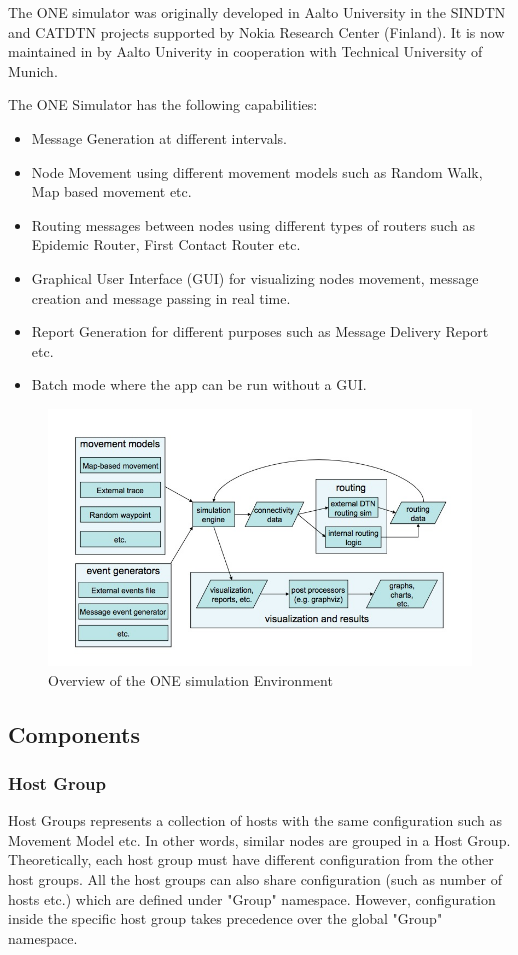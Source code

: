 The ONE simulator was originally developed in Aalto University in the SINDTN \cite{sindtn} and CATDTN projects supported by Nokia Research Center (Finland). It is now maintained in by Aalto Univerity in cooperation with Technical University of Munich.\newline

The ONE Simulator has the following capabilities:
\begin{itemize}
  \item Message Generation at different intervals.
  \item Node Movement using different movement models such as Random Walk, Map based movement etc.
  \item Routing messages between nodes using different types of routers such as Epidemic Router, First Contact Router etc.
  \item Graphical User Interface (GUI) for visualizing nodes movement, message creation and message passing in real time.
  \item Report Generation for different purposes such as Message Delivery Report etc.
  \item Batch mode where the app can be run without a GUI.
\end{itemize}

\begin{figure}[h]
\includegraphics[scale=0.5]{./figures/one}
\caption{Overview of the ONE simulation Environment \cite{keranen-theone}}
\end{figure}

\subsection{Components}
\subsubsection{Host Group}
Host Groups represents a collection of hosts with the same configuration such as Movement Model etc. In other words, similar nodes are grouped in a Host Group. Theoretically, each host group must have different configuration from the other host groups. All the host groups can also share configuration (such as number of hosts etc.) which are defined under "Group" namespace. However, configuration inside the specific host group takes precedence over the global "Group" namespace.
